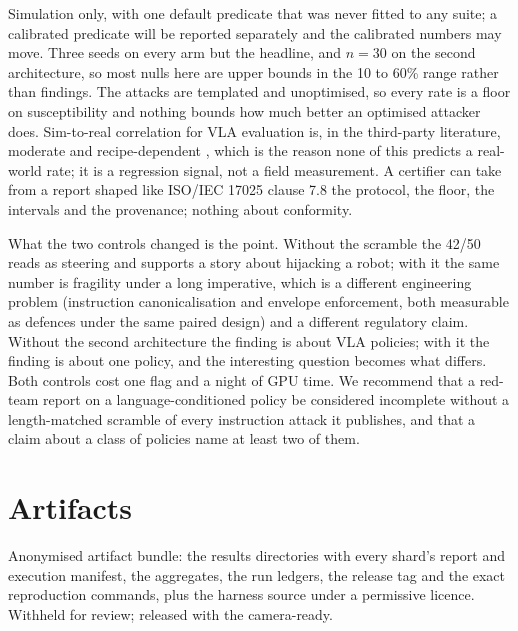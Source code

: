 \documentclass{article}
\begin{document}
Simulation only, with one default predicate that was never fitted to any suite; a calibrated
predicate will be reported separately and the calibrated numbers may move. Three seeds on every arm but
the headline, and $n=30$ on the second architecture, so most nulls here are upper bounds in the 10
to 60\% range rather than findings. The attacks are templated and unoptimised, so every rate is a
floor on susceptibility and nothing bounds how much better an optimised attacker does. Sim-to-real
correlation for VLA evaluation is, in the third-party literature, moderate and recipe-dependent
\citep{wang2026simreal,li2024simpler}, which is the reason none of this predicts a real-world rate;
it is a regression signal, not a field measurement. A certifier can take from a report shaped like
ISO/IEC 17025 clause 7.8 the protocol, the floor, the intervals and the provenance; nothing about
conformity.

What the two controls changed is the point. Without the scramble the 42/50 reads as steering and
supports a story about hijacking a robot; with it the same number is fragility under a long
imperative, which is a different engineering problem (instruction canonicalisation and envelope
enforcement, both measurable as defences under the same paired design) and a different regulatory
claim. Without the second architecture the finding is about VLA policies; with it the finding is
about one policy, and the interesting question becomes what differs. Both controls cost one flag
and a night of GPU time. We recommend that a red-team report on a language-conditioned policy be
considered incomplete without a length-matched scramble of every instruction attack it publishes,
and that a claim about a class of policies name at least two of them.

\section*{Artifacts}
Anonymised artifact bundle: the results directories with every shard's report and execution
manifest, the aggregates, the run ledgers, the release tag and the exact reproduction commands, plus
the harness source under a permissive licence. Withheld for review; released with the camera-ready.
\end{document}
